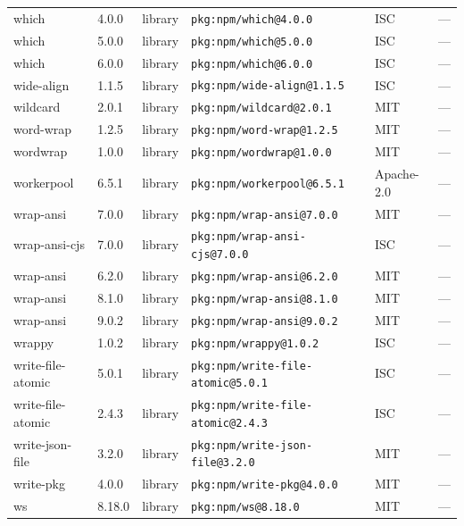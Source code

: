 \documentclass[11pt,a4paper]{article}
\begin{document}
\begin{longtable}{|p{4cm}|p{2cm}|p{1.6cm}|p{5cm}|p{1.5cm}|p{3.5cm}|}
\raggedright which & 4.0.0 & library & \small\texttt{pkg:npm/which@4.0.0} & ISC & \small — \\
\raggedright which & 5.0.0 & library & \small\texttt{pkg:npm/which@5.0.0} & ISC & \small — \\
\raggedright which & 6.0.0 & library & \small\texttt{pkg:npm/which@6.0.0} & ISC & \small — \\
\raggedright wide-align & 1.1.5 & library & \small\texttt{pkg:npm/wide-align@1.1.5} & ISC & \small — \\
\raggedright wildcard & 2.0.1 & library & \small\texttt{pkg:npm/wildcard@2.0.1} & MIT & \small — \\
\raggedright word-wrap & 1.2.5 & library & \small\texttt{pkg:npm/word-wrap@1.2.5} & MIT & \small — \\
\raggedright wordwrap & 1.0.0 & library & \small\texttt{pkg:npm/wordwrap@1.0.0} & MIT & \small — \\
\raggedright workerpool & 6.5.1 & library & \small\texttt{pkg:npm/workerpool@6.5.1} & Apache-2.0 & \small — \\
\raggedright wrap-ansi & 7.0.0 & library & \small\texttt{pkg:npm/wrap-ansi@7.0.0} & MIT & \small — \\
\raggedright wrap-ansi-cjs & 7.0.0 & library & \small\texttt{pkg:npm/wrap-ansi-cjs@7.0.0} & ISC & \small — \\
\raggedright wrap-ansi & 6.2.0 & library & \small\texttt{pkg:npm/wrap-ansi@6.2.0} & MIT & \small — \\
\raggedright wrap-ansi & 8.1.0 & library & \small\texttt{pkg:npm/wrap-ansi@8.1.0} & MIT & \small — \\
\raggedright wrap-ansi & 9.0.2 & library & \small\texttt{pkg:npm/wrap-ansi@9.0.2} & MIT & \small — \\
\raggedright wrappy & 1.0.2 & library & \small\texttt{pkg:npm/wrappy@1.0.2} & ISC & \small — \\
\raggedright write-file-atomic & 5.0.1 & library & \small\texttt{pkg:npm/write-file-atomic@5.0.1} & ISC & \small — \\
\raggedright write-file-atomic & 2.4.3 & library & \small\texttt{pkg:npm/write-file-atomic@2.4.3} & ISC & \small — \\
\raggedright write-json-file & 3.2.0 & library & \small\texttt{pkg:npm/write-json-file@3.2.0} & MIT & \small — \\
\raggedright write-pkg & 4.0.0 & library & \small\texttt{pkg:npm/write-pkg@4.0.0} & MIT & \small — \\
\raggedright ws & 8.18.0 & library & \small\texttt{pkg:npm/ws@8.18.0} & MIT & \small — \\

\end{longtable}
\end{document}
